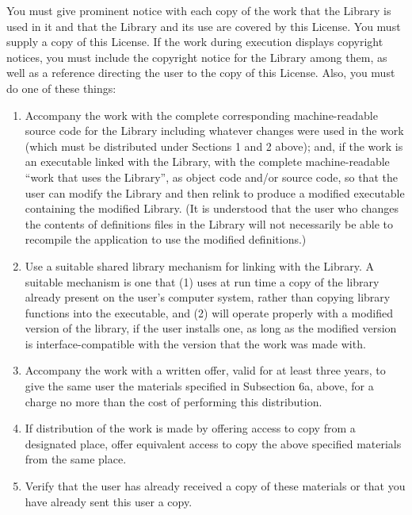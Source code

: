{\begin{multicols}{2}
\begin{enumerate}
You must give prominent notice with each copy of the work that the Library is 
used in it and that the Library and its use are covered by this License. You 
must supply a copy of this License. If the work during execution displays 
copyright notices, you must include the copyright notice for the Library among 
them, as well as a reference directing the user to the copy of this License. 
Also, you must do one of these things:

\begin{enumerate}

\item
Accompany the work with the complete corresponding machine-readable source code 
for the Library including whatever changes were used in the work (which must be 
distributed under Sections 1 and 2 above); and, if the work is an executable 
linked with the Library, with the complete machine-readable ``work that uses the 
Library'', as object code and/or source code, so that the user can modify the 
Library and then relink to produce a modified executable containing the modified 
Library. (It is understood that the user who changes the contents of definitions 
files in the Library will not necessarily be able to recompile the application 
to use the modified definitions.)

\item
Use a suitable shared library mechanism for linking with the Library. A suitable 
mechanism is one that (1) uses at run time a copy of the library already present 
on the user's computer system, rather than copying library functions into the 
executable, and (2) will operate properly with a modified version of the 
library, if the user installs one, as long as the modified version is 
interface-compatible with the version that the work was made with.

\item
Accompany the work with a written offer, valid for at least three years, to give 
the same user the materials specified in Subsection 6a, above, for a charge no 
more than the cost of performing this distribution.

\item
If distribution of the work is made by offering access to copy from a designated 
place, offer equivalent access to copy the above specified materials from the 
same place.

\item
Verify that the user has already received a copy of these materials or that you 
have already sent this user a copy. 


\end{enumerate}
\end{enumerate}
\end{multicols}}
